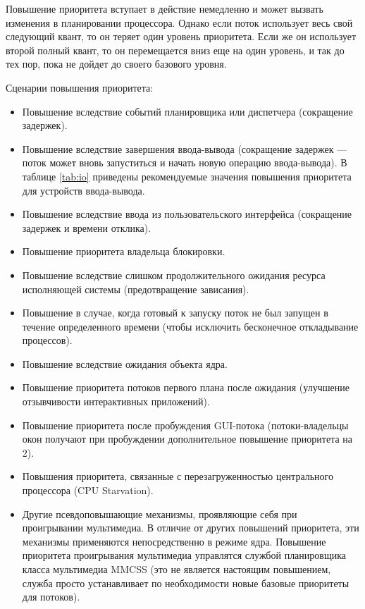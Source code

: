 \documentclass[a4paper,oneside,14pt]{extarticle}
\begin{document}
Повышение приоритета вступает в действие немедленно и может  вызвать изменения в планировании процессора.
Однако если поток использует весь свой следующий квант, то он теряет один уровень приоритета.
Если же он использует второй полный квант, то он перемещается вниз еще  на один уровень, и так до тех пор, пока не дойдет до своего базового уровня. 

Сценарии повышения приоритета:
\begin{itemize}
	\item Повышение вследствие событий планировщика или диспетчера (сокращение задержек).
	\item Повышение вследствие завершения ввода-вывода (сокращение задержек --- поток может вновь запуститься и начать новую операцию ввода-вывода). В таблице \ref{tab:io} приведены рекомендуемые значения повышения приоритета для устройств ввода-вывода.
	\item Повышение вследствие ввода из пользовательского интерфейса (сокращение задержек и времени отклика).
	\item Повышение приоритета владельца блокировки.
	\item Повышение вследствие слишком продолжительного ожидания ресурса исполняющей системы (предотвращение зависания).
	\item Повышение в случае, когда готовый к запуску поток не был запущен в течение определенного времени (чтобы исключить бесконечное откладывание процессов).
	\item Повышение вследствие ожидания объекта ядра.
	\item Повышение приоритета потоков первого плана после ожидания (улучшение отзывчивости интерактивных приложений).
	\item Повышение приоритета после пробуждения GUI-потока (потоки-владельцы окон получают при пробуждении дополнительное повышение приоритета на 2).
	\item Повышения приоритета, связанные с перезагруженностью центрального процессора (CPU Starvation).
	\item Другие псевдоповышающие механизмы, проявляющие себя при проигрывании мультимедиа. В отличие от других повышений приоритета, эти механизмы применяются непосредственно в режиме ядра. Повышение приоритета проигрывания мультимедиа управлятся службой планировщика класса мультимедиа MMCSS (это не является настоящим повышением, служба просто устанавливает по необходимости новые базовые приоритеты для потоков).
\end{itemize}
\end{document}
